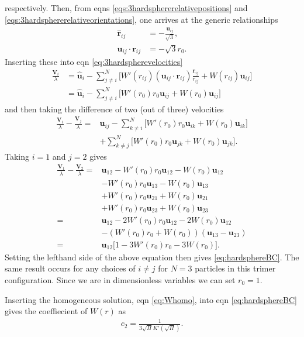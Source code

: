 \documentclass[twocolumn,amsmath,amssymb,aps]{revtex4-1}%
\begin{document}
respectively. Then, from eqns \ref{eqs:3hardsphererelativepositions}
and \ref{eqs:3hardsphererelativeorientations}, one arrives at the generic
relationships
\begin{align}
  \bm{\hat{r}}_{ij} &= -\frac{\bm{u}_{ij}}{\sqrt{3}},\\
  \bm{u}_{ij}\cdot\bm{r}_{ij} &= -\sqrt{3}r_0.
\end{align}
Inserting these into eqn \ref{eq:3hardspherevelocities}
\begin{align}
  \frac{\bm{V}_i}{\lambda}
  &=\bm{\hat{u}}_i-\sum_{j\neq i}^N \bigg[W'(r_{ij})
    (\bm{u}_{ij}\cdot\bm{r}_{ij})\frac{\bm{r}_{ij}}{r_{ij}}
    +W(r_{ij})\bm{u}_{ij}\bigg]\nonumber\\
  &=\bm{\hat{u}}_i-\sum_{j\neq i}^N \bigg[W'(r_0)
    r_0\bm{u}_{ij}+W(r_0)\bm{u}_{ij}\bigg]
\end{align}
and then taking the difference of two (out of three) velocities
\begin{align}
  \frac{\bm{V}_i}{\lambda}-\frac{\bm{V}_j}{\lambda}
  =&\bm{u}_{ij}-\sum_{k\neq i}^N \bigg[W'(r_0)
    r_0\bm{u}_{ik}+W(r_0)\bm{u}_{ik}\bigg]\nonumber\\
  &+\sum_{k\neq j}^N \bigg[W'(r_0)
    r_0\bm{u}_{jk}+W(r_0)\bm{u}_{jk}\bigg].
\end{align}
Taking $i=1$ and $j=2$ gives
\begin{align}
  \frac{\bm{V}_1}{\lambda}-\frac{\bm{V}_2}{\lambda}
  =&\bm{u}_{12}-W'(r_0)r_0\bm{u}_{12}-W(r_0)\bm{u}_{12}
  \nonumber\\
  &-W'(r_0)r_0\bm{u}_{13}-W(r_0)\bm{u}_{13}\nonumber\\
  &+W'(r_0)r_0\bm{u}_{21}+W(r_0)\bm{u}_{21}\nonumber\\
  &+W'(r_0)r_0\bm{u}_{23}+W(r_0)\bm{u}_{23}\nonumber\\
  =&\bm{u}_{12}-2W'(r_0)r_0\bm{u}_{12}-2W(r_0)\bm{u}_{12}
  \nonumber\\
  &-(W'(r_0)r_0+W(r_0))(\bm{u}_{13}-\bm{u}_{23})\nonumber\\
  =&\bm{u}_{12}\big[1-3W'(r_0)r_0-3W(r_0)\big].
\end{align}
Setting the lefthand side of the above equation then gives
\ref{eq:hardsphereBC}. The same result occurs for any choices of $i\neq j$
for $N=3$ particles in this trimer configuration. Since we are in
dimensionless variables we can set $r_0=1$.

Inserting the homogeneous solution, eqn \ref{eq:Whomo}, into eqn
\ref{eq:hardsphereBC} gives the coeffiecient of $W(r)$ as
\begin{align}
  c_2 = \frac{1}{3\sqrt{\Pi}K'(\sqrt{\Pi})}.
\end{align}


\end{document}

